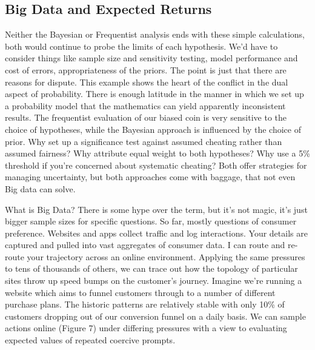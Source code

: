 \documentclass{tufte-handout}
\begin{document}
\subsection{Big Data and Expected Returns}
Neither the Bayesian or Frequentist analysis ends with these simple calculations, both would continue to probe the limits of each hypothesis. We'd have to consider things like sample size and sensitivity testing, model performance and cost of errors, appropriateness of the priors. The point is just that there are reasons for dispute. This example shows the heart of the conflict in the dual aspect of probability. There is enough latitude in the manner in which we set up a probability model that the mathematics can yield apparently inconsistent results. The frequentist evaluation of our biased coin is very sensitive to the choice of hypotheses, while the Bayesian approach is influenced by the choice of prior. Why set up a significance test against assumed cheating rather than assumed fairness? Why attribute equal weight to both hypotheses? Why use a 5\% threshold if you're concerned about systematic cheating? Both offer strategies for managing uncertainty, but both approaches come with baggage, that not even Big data can solve.
\linebreak

\noindent What is Big Data? There is some hype over the term, but it's not magic, it's just bigger sample sizes for specific questions. So far, mostly questions of consumer preference. Websites and apps collect traffic and log interactions. Your details are captured and pulled into vast aggregates of consumer data. I can route and re-route your trajectory across an online environment. Applying the same pressures to tens of thousands of others, we can trace out how the topology of particular sites throw up speed bumps on the customer's journey. Imagine we're running a website which aims to funnel customers through to a number of different purchase plans. The historic patterns are relatively stable with only 10\% of customers dropping out of our conversion funnel on a daily basis. We can sample actions online (Figure 7) under differing pressures with a view to evaluating expected values of repeated coercive prompts.
\linebreak
\end{document}
